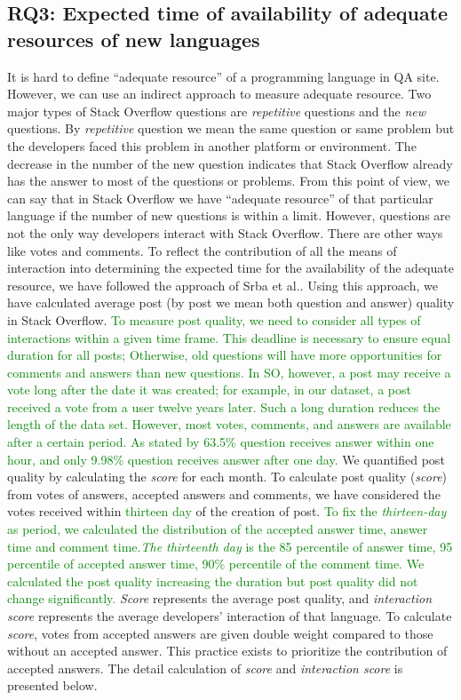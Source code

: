 \subsection{RQ3: Expected time of availability of adequate resources of new languages}
\label{RQ2}

It is hard to define ``adequate resource'' of a programming language in QA site. However, we can use an indirect approach to measure adequate resource. Two major types of Stack Overflow questions are \emph{repetitive} questions and the \emph{new} questions. By \emph{repetitive} question we mean the same question or same problem but the developers \citep{TausczikWC17} faced this problem in another platform or environment. The decrease in the number of the new question indicates that Stack Overflow already has the answer to most of the questions or problems. From this point of view, we can say that in Stack Overflow we have ``adequate resource'' of that particular language if the number of new questions is within a limit. However,  questions are not the only way developers interact with Stack Overflow.
There are other ways like votes and comments. To reflect the contribution of all the means of interaction into determining the expected time for the availability of the adequate resource, we have followed the approach of Srba et al.\citep{Srba2016}. Using this approach, we have calculated average post (by post we mean both question and answer) quality in Stack Overflow. \textcolor{green}{To measure post quality, we need to consider all types of interactions within a given time frame. This deadline is necessary to ensure equal duration for all posts; Otherwise, old questions will have more opportunities for comments and answers than new questions. In SO, however, a post may receive a vote long after the date it was created; for example, in our dataset, a post received a vote from a user twelve years later. Such a long duration reduces the length of the data set. However, most votes, comments, and answers are available after a certain period. As stated by \citep{Bhat2014} 63.5\% question receives answer within one hour, and only 9.98\% question receives answer after one day.} We quantified post quality by calculating the \emph{score} for each month. To calculate post quality (\emph{score}) from votes of answers, accepted answers and comments, we have considered the votes received within \textcolor{green}{thirteen day} of the creation of post. \textcolor{green}{To fix the \emph{thirteen-day} as period, we calculated the distribution of the accepted answer time, answer time and comment time.\emph{The thirteenth day} is the 85 percentile of answer time, 95 percentile of accepted answer time, 90\% percentile of the comment time. We calculated the post quality increasing the duration but post quality did not change significantly.} \emph{Score} represents the average post quality, and \emph{interaction score} represents the average developers' interaction of that language. To calculate \emph{score}, votes from accepted answers are given double weight compared to those without an accepted answer. This practice exists\citep{Romano2013}  to prioritize the  contribution of accepted answers. The detail calculation of \emph{score} and \emph{interaction score} is presented below.

